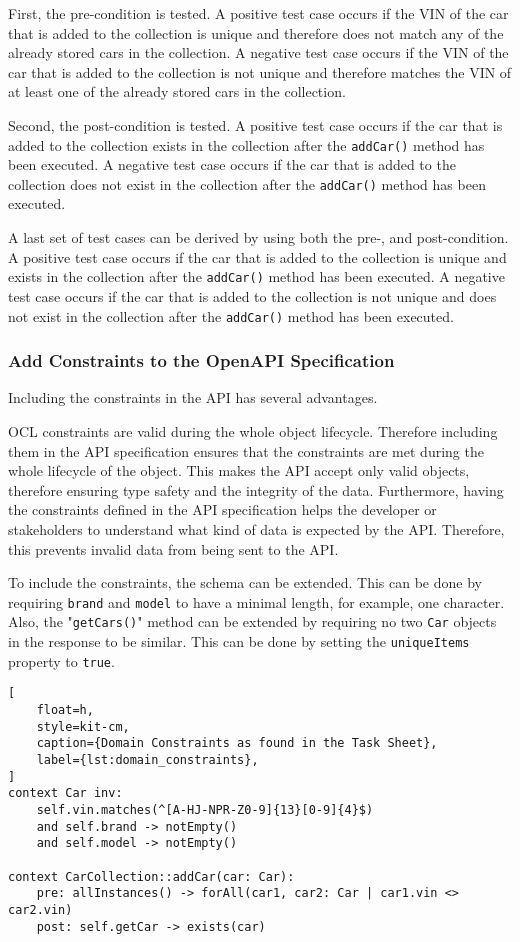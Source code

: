 First, the pre-condition is tested.
A positive test case occurs if the VIN of the car that is added to the collection is unique and therefore does not match any of the already stored cars in the collection.
A negative test case occurs if the VIN of the car that is added to the collection is not unique and therefore matches the VIN of at least one of the already stored cars in the collection.

Second, the post-condition is tested.
A positive test case occurs if the car that is added to the collection exists in the collection after the \texttt{addCar()} method has been executed.
A negative test case occurs if the car that is added to the collection does not exist in the collection after the \texttt{addCar()} method has been executed.

A last set of test cases can be derived by using both the pre-, and post-condition.
A positive test case occurs if the car that is added to the collection is unique and exists in the collection after the \texttt{addCar()} method has been executed.
A negative test case occurs if the car that is added to the collection is not unique and does not exist in the collection after the \texttt{addCar()} method has been executed.

\subsubsection*{Add Constraints to the OpenAPI Specification}
Including the constraints in the API has several advantages.

OCL constraints are valid during the whole object lifecycle.
Therefore including them in the API specification ensures that the constraints are met during the whole lifecycle of the object.
This makes the API accept only valid objects, therefore ensuring type safety and the integrity of the data.
Furthermore, having the constraints defined in the API specification helps the developer or stakeholders to understand what kind of data is expected by the API.
Therefore, this prevents invalid data from being sent to the API.

To include the constraints, the schema can be extended.
This can be done by requiring \texttt{brand} and \texttt{model} to have a minimal length, for example, one character.
Also, the "\texttt{getCars()}" method can be extended by requiring no two \texttt{Car} objects in the response to be similar.
This can be done by setting the \texttt{uniqueItems} property to \texttt{true}.

\begin{lstlisting}[
    float=h,
    style=kit-cm,
    caption={Domain Constraints as found in the Task Sheet},
    label={lst:domain_constraints}, 
]
context Car inv:
    self.vin.matches(^[A-HJ-NPR-Z0-9]{13}[0-9]{4}$)
    and self.brand -> notEmpty()
    and self.model -> notEmpty()

context CarCollection::addCar(car: Car):
    pre: allInstances() -> forAll(car1, car2: Car | car1.vin <> car2.vin)
    post: self.getCar -> exists(car)
\end{lstlisting}